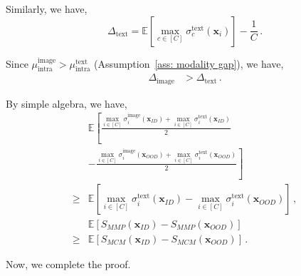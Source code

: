 Similarly, we have,
\begin{equation}
    \Delta_{\text{text}} = \mathbb{E}\left[\max_{c\in[C]}\sigma_{c}^{\text{text}}(\mathbf{x}_i)\right] - \frac{1}{C}\,.    
\end{equation}

Since $\mu_{\text{intra}}^{\text{image}} > \mu_{\text{intra}}^{\text{text}}$ (Assumption~\ref{ass: modality gap}), we have,
\begin{equation}
    \begin{aligned}
        \Delta_{\text{image}} & > \Delta_{\text{text}}  \,.        
    \end{aligned}
\end{equation}

By simple algebra, we have,
\begin{equation}
    \begin{aligned}
        &  \mathbb{E}\left[\frac{\max_{i \in [C]} \sigma_i^{\text{image}}(\mathbf{x}_{\textit{ID}}) + \max_{i \in [C]} \sigma_i^{\text{text}}(\mathbf{x}_{\textit{ID}})}{2} \right.\\
        & \left. - \frac{\max_{i \in [C]} \sigma_i^{\text{image}}(\mathbf{x}_{\textit{OOD}}) + \max_{i \in [C]} \sigma_i^{\text{text}}(\mathbf{x}_{\textit{OOD}})}{2}\right] \\
        \geq &  \mathbb{E}\left[\max_{i \in [C]} \sigma_i^{\text{text}}(\mathbf{x}_{\textit{ID}}) - \max_{i \in [C]} \sigma_i^{\text{text}}(\mathbf{x}_{\textit{OOD}})\right]\,, \\
        & \mathbb{E}\left[ S_{\textit{MMP}}(\mathbf{x}_{\textit{ID}}) - S_{\textit{MMP}}(\mathbf{x}_{\textit{OOD}}) \right] \\
        \geq & \mathbb{E}\left[ S_{\textit{MCM}}(\mathbf{x}_{ID}) - S_{\textit{MCM}}(\mathbf{x}_{\textit{OOD}}) \right]\,.
    \end{aligned}
\end{equation}

Now, we complete the proof.
